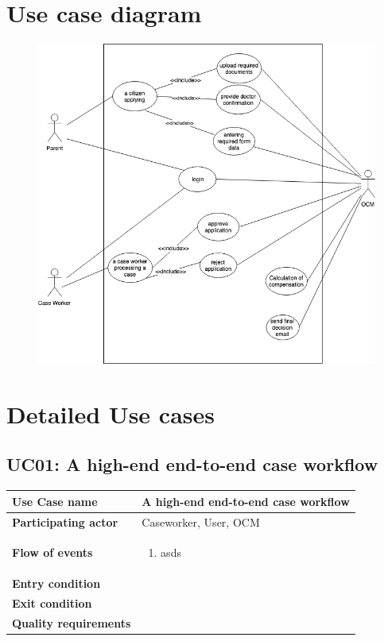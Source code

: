 \documentclass{article}
\begin{document}
\section{Use case diagram}


\begin{figure}[htb!]
	\includegraphics[width=\textwidth]{img/use-cases}
\end{figure}


\section{Detailed Use cases}

\subsection{UC01: A high-end end-to-end case workflow}

\begin{tabularx}{\textwidth}{l|l}
	\textbf{Use Case name} & A high-end end-to-end case workflow \\
	\hline
	\textbf{Participating actor} & Caseworker, User, OCM\\
	\hline
	\textbf{Flow of events} &
	\begin{minipage}{\linewidth}
		\begin{enumerate}
			\item asds
		\end{enumerate} 
	\end{minipage}\\
	\hline
	\textbf{Entry condition} & \\
	\hline
	\textbf{Exit condition} & \\
	\hline
	\textbf{Quality requirements} & \\
\end{tabularx}
\end{document}
